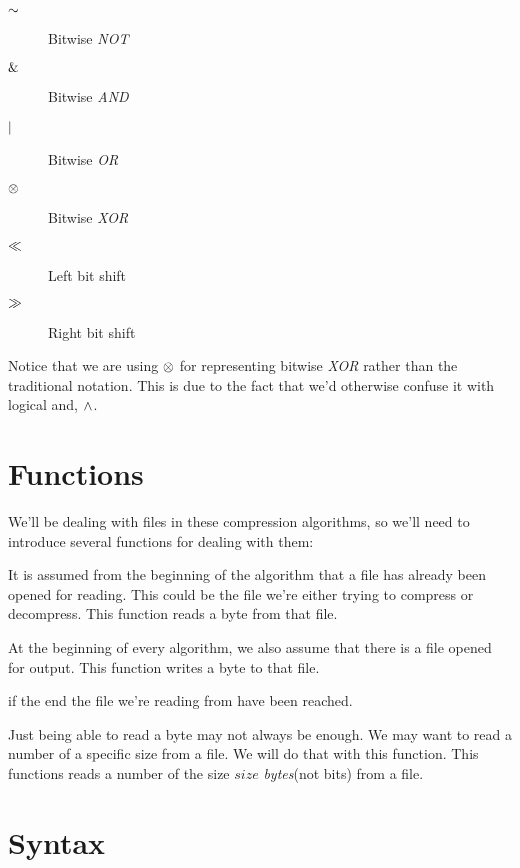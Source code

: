 \begin{description}
\item[$\mathord{\sim}$] Bitwise \textit{NOT}
\item[$\mathrel{\&}$] Bitwise \textit{AND}
\item[$\mathrel{|}$] Bitwise \textit{OR}
\item[$\mathrel{\otimes}$] Bitwise \textit{XOR}
\item[$\ll$] Left bit shift
\item[$\gg$] Right bit shift
\end{description}

Notice that we are using $\mathrel{\otimes}$ for representing bitwise
\textit{XOR} rather than the traditional \C{} notation. This is due to
the fact that we'd otherwise confuse it with logical and, $\wedge$.

\section{Functions}
\label{sec:pseudocode}

We'll be dealing with files in these compression algorithms, so we'll
need to introduce several functions for dealing with them:

\begin{description}[font=\normalfont]
\item[\textproc{ReadByte}] It is assumed from the beginning of the
  algorithm that a file has already been opened for reading. This
  could be the file we're either trying to compress or
  decompress. This function reads a byte from that file.

\item[\Call{WriteByte}{$byte$}] At the beginning of every algorithm,
  we also assume that there is a file opened for output. This function
  writes a byte to that file.

\item[\textproc{EndOfFileReached}] \True{} if the end the file we're
  reading from have been reached.

\item[\Call{Read}{$size$}] Just being able to read a byte may not
  always be enough. We may want to read a number of a specific size
  from a file. We will do that with this function. This functions
  reads a number of the size $size$ \textit{bytes}(not bits) from a file.

\end{description}

\section{Syntax}
\label{sec:other-conventions}

